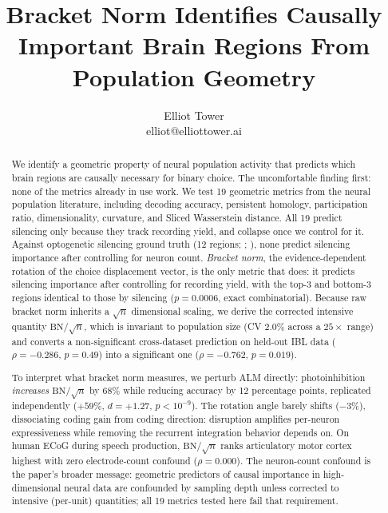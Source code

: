 \documentclass{article}
\title{Bracket Norm Identifies Causally Important Brain Regions From Population Geometry}
\author{\name Elliot Tower \\
      \email elliot@elliottower.ai}
\begin{document}
\maketitle

\begin{abstract}
We identify a geometric property of neural population activity that predicts which brain regions are causally necessary for binary choice. The uncomfortable finding first: none of the metrics already in use work. We test 19 geometric metrics from the neural population literature, including decoding accuracy, persistent homology, participation ratio, dimensionality, curvature, and Sliced Wasserstein distance. All 19 predict silencing only because they track recording yield, and collapse once we control for it. Against optogenetic silencing ground truth (12 regions; \citealp{steinmetz2019distributed}; \citealp{zatkahaas2021}), none predict silencing importance after controlling for neuron count. \emph{Bracket norm}, the evidence-dependent rotation of the choice displacement vector, is the only metric that does: it predicts silencing importance after controlling for recording yield, with the top-3 and bottom-3 regions identical to those by silencing ($p = 0.0006$, exact combinatorial). Because raw bracket norm inherits a $\sqrt{n}$ dimensional scaling, we derive the corrected intensive quantity $\text{BN}/\!\sqrt{n}$, which is invariant to population size (CV $2.0\%$ across a $25\times$ range) and converts a non-significant cross-dataset prediction on held-out IBL data ($\rho = -0.286$, $p = 0.49$) into a significant one ($\rho = -0.762$, $p = 0.019$).

To interpret what bracket norm measures, we perturb ALM directly: photoinhibition \emph{increases} $\text{BN}/\!\sqrt{n}$ by 68\% while reducing accuracy by 12 percentage points, replicated independently ($+59\%$, $d = +1.27$, $p < 10^{-9}$). The rotation angle barely shifts ($-3\%$), dissociating coding gain from coding direction: disruption amplifies per-neuron expressiveness while removing the recurrent integration behavior depends on. On human ECoG during speech production, $\text{BN}/\!\sqrt{n}$ ranks articulatory motor cortex highest with zero electrode-count confound ($\rho = 0.000$). The neuron-count confound is the paper's broader message: geometric predictors of causal importance in high-dimensional neural data are confounded by sampling depth unless corrected to intensive (per-unit) quantities; all 19 metrics tested here fail that requirement.
\end{abstract}
\end{document}
